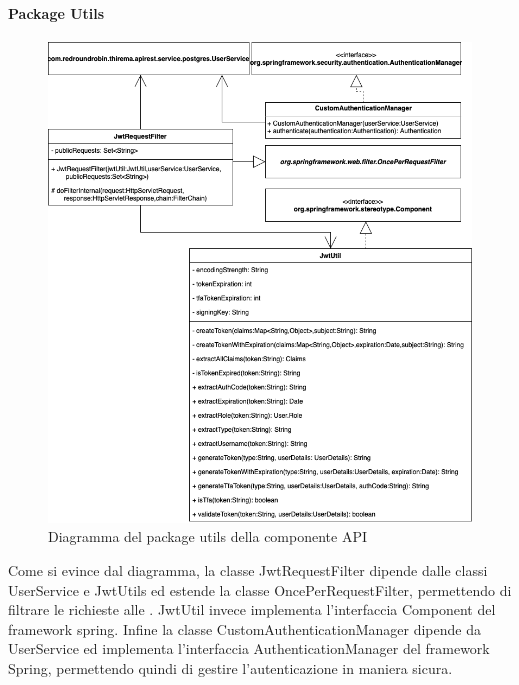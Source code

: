 		\paragraph*{Package Utils}
		\begin{figure}[H]
			\centering
			\includegraphics[scale=0.550]{res/images/API/UtilsPackage.png}
			\caption{Diagramma del package utils della componente API}
			\label{Diagramma 11}
		\end{figure}
		Come si evince dal diagramma, la classe JwtRequestFilter dipende dalle classi UserService e JwtUtils ed estende la classe OncePerRequestFilter, permettendo di filtrare le richieste alle .
		\newline
		JwtUtil invece implementa l'interfaccia Component del framework spring.
		\newline
		Infine la classe CustomAuthenticationManager dipende da UserService ed implementa l'interfaccia AuthenticationManager del framework Spring, permettendo quindi di gestire l'autenticazione in maniera sicura.
